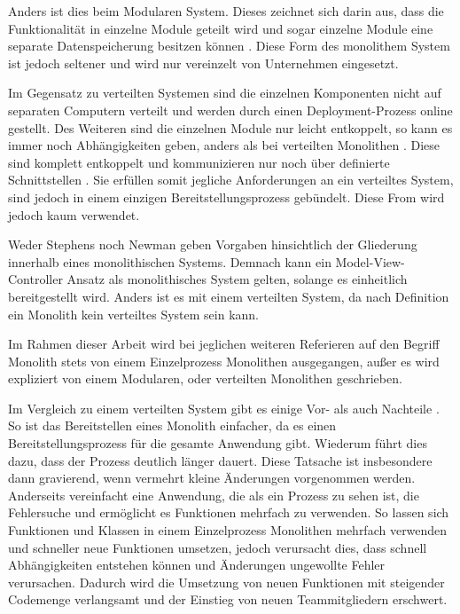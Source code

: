 Anders ist dies beim Modularen System. Dieses zeichnet sich darin aus, dass die Funktionalität in einzelne Module geteilt wird und sogar einzelne Module eine separate Datenspeicherung besitzen können \parencite[vgl.][Kap. 2.2.2]{newman_monolith_2019}. Diese Form des monolithem System ist jedoch seltener und wird nur vereinzelt von Unternehmen eingesetzt.

Im Gegensatz zu verteilten Systemen sind die einzelnen Komponenten nicht auf separaten Computern verteilt und werden durch einen Deployment-Prozess online gestellt. Des Weiteren sind die einzelnen Module nur leicht entkoppelt, so kann es immer noch Abhängigkeiten geben, anders als bei verteilten Monolithen \parencite[vgl.][Kap. 2.2.2]{newman_monolith_2019}. Diese sind komplett entkoppelt und kommunizieren nur noch über definierte Schnittstellen \parencite[vlg.][S. 116]{starke_effektive_2015}. Sie erfüllen somit jegliche Anforderungen an ein verteiltes System, sind jedoch in einem einzigen Bereitstellungsprozess gebündelt. Diese From wird jedoch kaum verwendet.

Weder Stephens noch Newman geben Vorgaben hinsichtlich der Gliederung innerhalb eines monolithischen Systems. Demnach kann ein Model-View-Controller Ansatz als monolithisches System gelten, solange es einheitlich bereitgestellt wird. Anders ist es mit einem verteilten System, da nach Definition ein Monolith kein verteiltes System sein kann. 

Im Rahmen dieser Arbeit wird bei jeglichen weiteren Referieren auf den Begriff Monolith stets von einem Einzelprozess Monolithen ausgegangen, außer es wird expliziert von einem Modularen, oder verteilten Monolithen geschrieben.

Im Vergleich zu einem verteilten System gibt es einige Vor- als auch Nachteile \parencite[vgl.][Kap. 2.2.4 und Kap. 2.2.5]{newman_monolith_2019}. So ist das Bereitstellen eines Monolith einfacher, da es einen Bereitstellungsprozess für die gesamte Anwendung gibt. Wiederum führt dies dazu, dass der Prozess deutlich länger dauert. Diese Tatsache ist insbesondere dann gravierend, wenn vermehrt kleine Änderungen vorgenommen werden. Anderseits vereinfacht eine Anwendung, die als ein Prozess zu sehen ist, die Fehlersuche und ermöglicht es Funktionen mehrfach zu verwenden. So lassen sich Funktionen und Klassen in einem Einzelprozess Monolithen mehrfach verwenden und schneller neue Funktionen umsetzen, jedoch verursacht dies, dass schnell Abhängigkeiten entstehen können und Änderungen ungewollte Fehler verursachen. Dadurch wird die Umsetzung von neuen Funktionen mit steigender Codemenge verlangsamt und der Einstieg von neuen Teammitgliedern erschwert.


